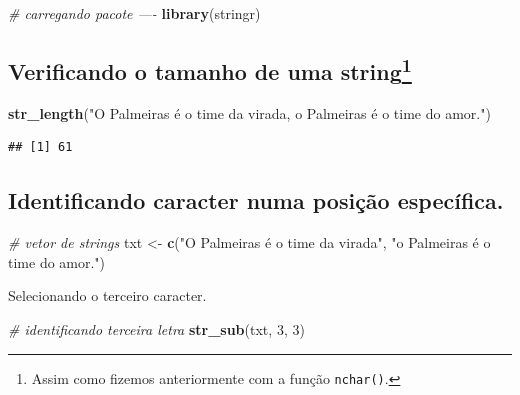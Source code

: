 \documentclass[]{book}
\newenvironment{Shaded}{\begin{snugshade}}{\end{snugshade}}
\newcommand{\CommentTok}[1]{\textcolor[rgb]{0.56,0.35,0.01}{\textit{#1}}}
\newcommand{\DecValTok}[1]{\textcolor[rgb]{0.00,0.00,0.81}{#1}}
\newcommand{\KeywordTok}[1]{\textcolor[rgb]{0.13,0.29,0.53}{\textbf{#1}}}
\newcommand{\NormalTok}[1]{#1}
\newcommand{\StringTok}[1]{\textcolor[rgb]{0.31,0.60,0.02}{#1}}
\begin{document}
\begin{Shaded}
\begin{Highlighting}[]
\CommentTok{# carregando pacote ----}
\KeywordTok{library}\NormalTok{(stringr)}
\end{Highlighting}
\end{Shaded}

\hypertarget{verificando-o-tamanho-de-uma-string}{%
\subsection[Verificando o tamanho de uma string]{\texorpdfstring{Verificando o tamanho de uma string\footnote{Assim como fizemos anteriormente com a função \texttt{nchar()}.}}{Verificando o tamanho de uma string}}\label{verificando-o-tamanho-de-uma-string}}

\begin{Shaded}
\begin{Highlighting}[]
\KeywordTok{str_length}\NormalTok{(}\StringTok{"O Palmeiras é o time da virada, o Palmeiras é o time do amor."}\NormalTok{)}
\end{Highlighting}
\end{Shaded}

\begin{verbatim}
## [1] 61
\end{verbatim}

\hypertarget{identificando-caracter-numa-posiuxe7uxe3o-especuxedfica.}{%
\subsection{Identificando caracter numa posição específica.}\label{identificando-caracter-numa-posiuxe7uxe3o-especuxedfica.}}

\begin{Shaded}
\begin{Highlighting}[]
\CommentTok{# vetor de strings}
\NormalTok{txt <-}\StringTok{ }\KeywordTok{c}\NormalTok{(}\StringTok{"O Palmeiras é o time da virada"}\NormalTok{, }\StringTok{"o Palmeiras é o time do amor."}\NormalTok{)}
\end{Highlighting}
\end{Shaded}

Selecionando o terceiro caracter.

\begin{Shaded}
\begin{Highlighting}[]
\CommentTok{# identificando terceira letra}
\KeywordTok{str_sub}\NormalTok{(txt, }\DecValTok{3}\NormalTok{, }\DecValTok{3}\NormalTok{)}
\end{Highlighting}
\end{Shaded}
\end{document}
